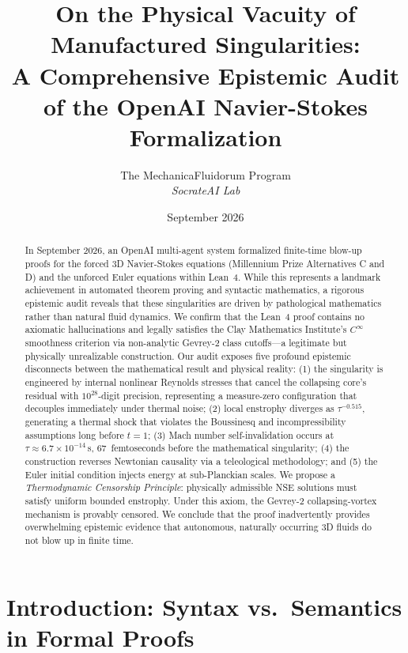\documentclass[11pt,a4paper]{article}
\title{\textbf{On the Physical Vacuity of Manufactured Singularities:\\ A Comprehensive Epistemic Audit of the OpenAI Navier-Stokes Formalization}}
\author{The MechanicaFluidorum Program \\ \textit{SocrateAI Lab}}
\date{September 2026}
\begin{document}
\maketitle

\begin{abstract}
In September 2026, an OpenAI multi-agent system formalized finite-time blow-up proofs for the
forced 3D Navier-Stokes equations (Millennium Prize Alternatives C and D) and the unforced Euler
equations within Lean~4. While this represents a landmark achievement in automated theorem proving
and syntactic mathematics, a rigorous epistemic audit reveals that these singularities are driven
by pathological mathematics rather than natural fluid dynamics. We confirm that the Lean~4 proof
contains no axiomatic hallucinations and legally satisfies the Clay Mathematics Institute's
$C^\infty$ smoothness criterion via non-analytic Gevrey-2 class cutoffs---a legitimate but
physically unrealizable construction. Our audit exposes five profound epistemic disconnects between
the mathematical result and physical reality: (1) the singularity is engineered by internal
nonlinear Reynolds stresses that cancel the collapsing core's residual with $10^{28}$-digit
precision, representing a measure-zero configuration that decouples immediately under thermal
noise; (2) local enstrophy diverges as $\tau^{-0.515}$, generating a thermal shock that violates
the Boussinesq and incompressibility assumptions long before $t=1$; (3) Mach number
self-invalidation occurs at $\tau \approx 6.7 \times 10^{-14}$\,s, 67~femtoseconds before the
mathematical singularity; (4) the construction reverses Newtonian causality via a teleological
methodology; and (5) the Euler initial condition injects energy at sub-Planckian scales. We
propose a \emph{Thermodynamic Censorship Principle}: physically admissible NSE solutions must
satisfy uniform bounded enstrophy. Under this axiom, the Gevrey-2 collapsing-vortex mechanism is
provably censored. We conclude that the proof inadvertently provides overwhelming epistemic evidence
that autonomous, naturally occurring 3D fluids do not blow up in finite time.
\end{abstract}

\section{Introduction: Syntax vs.\ Semantics in Formal Proofs}
\end{document}

